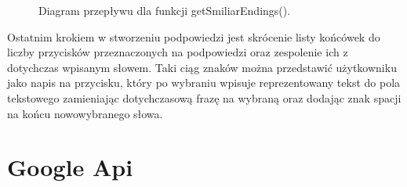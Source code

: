\documentclass[twoside,a4paper]{book}
\begin{document}
				\begin{figure}[!h]
		\centering
		\caption{Diagram przepływu dla funkcji getSmiliarEndings().}
		\label{fig:similarEndingsFlow}
		\end{figure}
Ostatnim krokiem w stworzeniu podpowiedzi jest skrócenie listy końcówek do liczby przycisków przeznaczonych na podpowiedzi oraz zespolenie ich z dotychczas wpisanym słowem. Taki ciąg znaków można przedstawić użytkowniku jako napis na przycisku, który po wybraniu wpisuje reprezentowany tekst do pola tekstowego zamieniając dotychczasową frazę na wybraną oraz dodając znak spacji na końcu nowowybranego słowa.

\section{Google Api}
\end{document}
